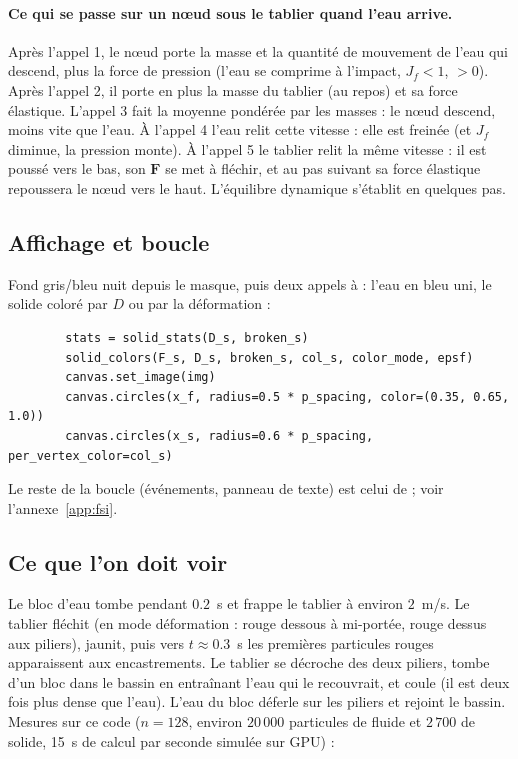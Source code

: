 \documentclass[11pt,a4paper]{article}
\newcommand{\code}[1]{\texttt{\detokenize{#1}}}
\begin{document}
\paragraph{Ce qui se passe sur un n\oe ud sous le tablier quand l'eau arrive.} Après l'appel 1, le
n\oe ud porte la masse et la quantité de mouvement de l'eau qui descend, plus la force de pression
(l'eau se comprime à l'impact, $J_f < 1$, \code{stress} $> 0$). Après l'appel 2, il porte en plus
la masse du tablier (au repos) et sa force élastique. L'appel 3 fait la moyenne pondérée par les
masses : le n\oe ud descend, moins vite que l'eau. À l'appel 4 l'eau relit cette vitesse : elle
est freinée (et $J_f$ diminue, la pression monte). À l'appel 5 le tablier relit la même vitesse :
il est poussé vers le bas, son $\mathbf F$ se met à fléchir, et au pas suivant sa force élastique
repoussera le n\oe ud vers le haut. L'équilibre dynamique s'établit en quelques pas.

\subsection{Affichage et boucle}

Fond gris/bleu nuit depuis le masque, puis deux appels à \code{canvas.circles} : l'eau en bleu
uni, le solide coloré par $D$ ou par la déformation :

\begin{lstlisting}
        stats = solid_stats(D_s, broken_s)
        solid_colors(F_s, D_s, broken_s, col_s, color_mode, epsf)
        canvas.set_image(img)
        canvas.circles(x_f, radius=0.5 * p_spacing, color=(0.35, 0.65, 1.0))
        canvas.circles(x_s, radius=0.6 * p_spacing, per_vertex_color=col_s)
\end{lstlisting}
Le reste de la boucle (événements, panneau de texte) est celui de \code{main.py} ; voir
l'annexe~\ref{app:fsi}.

\subsection{Ce que l'on doit voir}

Le bloc d'eau tombe pendant $0.2$~s et frappe le tablier à environ $2$~m/s. Le tablier fléchit
(en mode déformation : rouge dessous à mi-portée, rouge dessus aux piliers), jaunit, puis vers
$t \approx 0.3$~s les premières particules rouges apparaissent aux encastrements. Le tablier se
décroche des deux piliers, tombe d'un bloc dans le bassin en entraînant l'eau qui le recouvrait,
et coule (il est deux fois plus dense que l'eau). L'eau du bloc déferle sur les piliers et
rejoint le bassin. Mesures sur ce code ($n = 128$, environ $20\,000$ particules de fluide et
$2\,700$ de solide, 15~s de calcul par seconde simulée sur GPU) :
\end{document}
